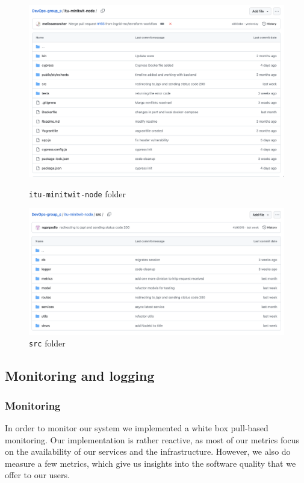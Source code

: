 \begin{figure}[H]
    \centering
    \begin{minipage}{0.45\textwidth}
        \centering
        \includegraphics[width=1.15\textwidth]{images/itu-minitwit-node-folder.png}
        \caption{\texttt{itu-minitwit-node} folder}
        \label{fig:minitwit-node}
    \end{minipage}\hfill
    \begin{minipage}{0.45\textwidth}
        \centering
        \includegraphics[width=1.15\textwidth]{images/src-folder.png} 
        \caption{\texttt{src} folder}
        \label{fig:src}
    \end{minipage}
\end{figure}

\subsection{Monitoring and logging}

\subsubsection{Monitoring}
In order to monitor our system we implemented a white box pull-based monitoring. Our implementation is rather reactive, as most of our metrics focus on the availability of our services and the infrastructure. However, we also do measure a few metrics, which give us insights into the software quality that we offer to our users. \\

